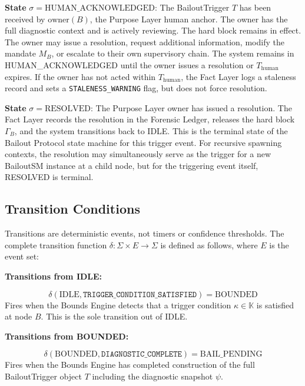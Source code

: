 \bigskip

\noindent\textbf{State} $\sigma = \text{HUMAN\_ACKNOWLEDGED}$: The BailoutTrigger $T$ has been received by $\text{owner}(B)$, the Purpose Layer human anchor. The owner has the full diagnostic context and is actively reviewing. The hard block remains in effect. The owner may issue a resolution, request additional information, modify the mandate $M_B$, or escalate to their own supervisory chain. The system remains in HUMAN\_ACKNOWLEDGED until the owner issues a resolution or $T_{\text{human}}$ expires. If the owner has not acted within $T_{\text{human}}$, the Fact Layer logs a staleness record and sets a \texttt{STALENESS\_WARNING} flag, but does not force resolution.

\bigskip

\noindent\textbf{State} $\sigma = \text{RESOLVED}$: The Purpose Layer owner has issued a resolution. The Fact Layer records the resolution in the Forensic Ledger, releases the hard block $\Gamma_B$, and the system transitions back to IDLE. This is the terminal state of the Bailout Protocol state machine for this trigger event. For recursive spawning contexts, the resolution may simultaneously serve as the trigger for a new BailoutSM instance at a child node, but for the triggering event itself, RESOLVED is terminal.

\subsection{Transition Conditions}
\label{sec:transition-conditions}

Transitions are deterministic events, not timers or confidence thresholds. The complete transition function $\delta : \Sigma \times E \rightarrow \Sigma$ is defined as follows, where $E$ is the event set:

\bigskip

\textbf{Transitions from IDLE:}

\begin{equation}
\delta(\text{IDLE}, \texttt{TRIGGER\_CONDITION\_SATISFIED}) = \text{BOUNDED}
\end{equation}
Fires when the Bounds Engine detects that a trigger condition $\kappa \in \mathbb{K}$ is satisfied at node $B$. This is the sole transition out of IDLE.

\bigskip

\textbf{Transitions from BOUNDED:}

\begin{equation}
\delta(\text{BOUNDED}, \texttt{DIAGNOSTIC\_COMPLETE}) = \text{BAIL\_PENDING}
\end{equation}
Fires when the Bounds Engine has completed construction of the full BailoutTrigger object $T$ including the diagnostic snapshot $\psi$.

